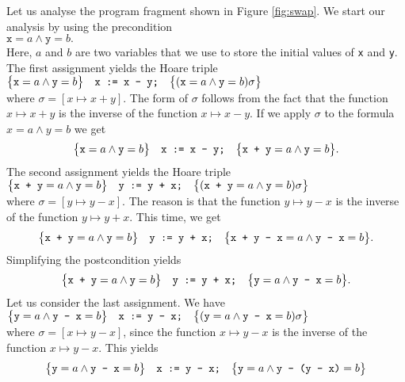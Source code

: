 \example
Let us analyse the program fragment shown in Figure \ref{fig:swap}.  
We start our analysis by using the precondition
\\[0.2cm]
\hspace*{1.3cm}
$ \texttt{x} = a \wedge \texttt{y} = b. $
\\[0.2cm]
Here, $a$ and $b$ are two variables that we use to store the initial values of \texttt{x} and
\texttt{y}.  The first assignment yields the Hoare triple
\\[0.2cm]
\hspace*{1.3cm}
$\bigl\{\texttt{x} = a \wedge \texttt{y} = b\bigr\}\quad\texttt{x := x - y;}\quad\bigl\{(\texttt{x} = a \wedge \texttt{y} =  b)\sigma\bigr\}$
\\[0.2cm] 
where $\sigma = [x \mapsto x + y]$. The form of $\sigma$ follows from the fact that the function $x \mapsto x + y$ is the inverse of the
function $x \mapsto x - y$.  If we apply $\sigma$ to the formula $x = a \wedge y = b$
we get
\begin{equation}
  \label{eq:swap1}
 \bigl\{\texttt{x} = a \wedge \texttt{y} = b\bigr\}\quad\texttt{x := x - y;}\quad\bigl\{\texttt{x + y} = a \wedge \texttt{y} = b\bigr\}.   
\end{equation}
The second assignment yields the Hoare triple
\\[0.2cm]
\hspace*{1.3cm}
$ \bigl\{\texttt{x + y} = a \wedge \texttt{y} = b\bigr\}\quad\texttt{y := y + x;}\quad\bigl\{(\texttt{x + y} = a \wedge  \texttt{y} = b)\sigma\bigr\}$
\\[0.2cm] 
where $\sigma = [y \mapsto y - x]$.  The reason is that the function $y \mapsto y - x$ is the inverse of the function $y \mapsto y + x$.
This time, we get
\[ \bigl\{\texttt{x + y} = a \wedge \texttt{y} = b\bigr\}\quad\texttt{y := y + x;}\quad\bigl\{
          \texttt{x + y - x} = a \wedge \texttt{y - x} = b\bigr\}.
\]
Simplifying the postcondition yields
\begin{equation}
  \label{eq:swap2}
 \bigl\{\texttt{x + y} = a \wedge \texttt{y} = b\bigr\}\quad\texttt{y := y + x;}\quad\bigl\{ \texttt{y} = a \wedge \texttt{y - x} = b\bigr\}.
\end{equation}
Let us consider the last assignment.  We have
\\[0.2cm]
\hspace*{1.3cm}
$\bigl\{\texttt{y} = a \wedge \texttt{y - x} = b\bigr\}\quad\texttt{x := y - x;}\quad\bigl\{ (\texttt{y} = a \wedge \texttt{y - x} = b)\sigma\bigr\}$ 
\\[0.2cm] 
where $\sigma = [x \mapsto y - x]$,
since the function $x \mapsto y - x$ is the inverse of the function $x \mapsto y - x$.
This yields
\[ \bigl\{\texttt{y} = a \wedge \texttt{y - x} = b\bigr\}\quad\texttt{x := y - x;}\quad\bigl\{
          \texttt{y} = a \wedge \texttt{y - (y - x)} = b\bigr\} 
\]
